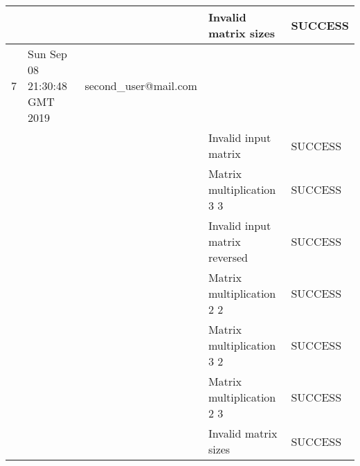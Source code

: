 \begin{table}[H]
{\begin{tabular}{|l|l|l|l|l|}
    &                              &                                 & Invalid matrix sizes          & SUCCESS \\ \hline
    7     & Sun Sep 08 21:30:48 GMT 2019 & second\_user@mail.com               &                               &         \\ \hline
    &                              &                                 & Invalid input matrix          & SUCCESS \\ \hline
    &                              &                                 & Matrix multiplication 3 3     & SUCCESS \\ \hline
    &                              &                                 & Invalid input matrix reversed & SUCCESS \\ \hline
    &                              &                                 & Matrix multiplication 2 2     & SUCCESS \\ \hline
    &                              &                                 & Matrix multiplication 3 2     & SUCCESS \\ \hline
    &                              &                                 & Matrix multiplication 2 3     & SUCCESS \\ \hline
    &                              &                                 & Invalid matrix sizes          & SUCCESS \\ \hline
\end{tabular}
\label{tab:matrix_multiplication}
}
\end{table}
